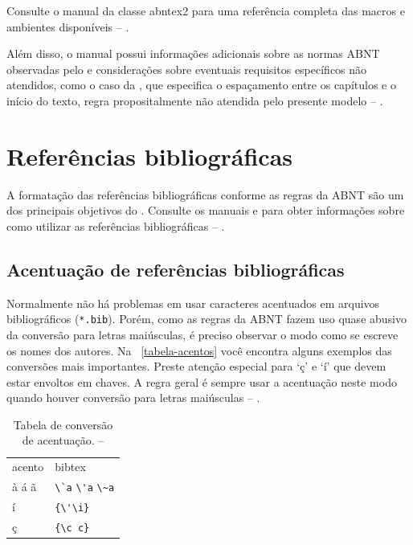 Consulte o manual da classe \textsf{abntex2} \cite{abntex2classe} para uma
referência completa das macros e ambientes disponíveis -- \showfont.

Além disso, o manual possui informações adicionais sobre as normas ABNT
observadas pelo \abnTeX{} e considerações sobre eventuais requisitos específicos
não atendidos, como o caso da \textcite[seção 5.2.2]{NBR14724:2011}, que
especifica o espaçamento entre os capítulos e o início do texto, regra
propositalmente não atendida pelo presente modelo -- \showfont.

\section{Referências bibliográficas}

A formatação das referências bibliográficas conforme as regras da ABNT são um
dos principais objetivos do \abnTeX{}. Consulte os manuais
\textcite{abntex2cite} e \textcite{abntex2cite-alf} para obter informações
sobre como utilizar as referências bibliográficas -- \showfont.

\subsection{Acentuação de referências bibliográficas}

Normalmente não há problemas em usar caracteres acentuados em arquivos
bibliográficos (\texttt{*.bib}). Porém, como as regras da ABNT fazem uso quase
abusivo da conversão para letras maiúsculas, é preciso observar o modo como se
escreve os nomes dos autores. Na ~\autoref{tabela-acentos} você encontra alguns
exemplos das conversões mais importantes. Preste atenção especial para `ç' e `í'
que devem estar envoltos em chaves. A regra geral é sempre usar a acentuação
neste modo quando houver conversão para letras maiúsculas -- \showfont.

\begin{table}[htbp]
\caption[Tabela de conversão de acentuação]
{Tabela de conversão de acentuação. -- \showfont}
\label{tabela-acentos}
\centering
\begin{tabular}{ll}\hline\hline
acento & \textsf{bibtex}\\
à á ã & \verb+\`a+ \verb+\'a+ \verb+\~a+\\
í & \verb+{\'\i}+\\
ç & \verb+{\c c}+\\
\hline\hline
\end{tabular}
\end{table}

